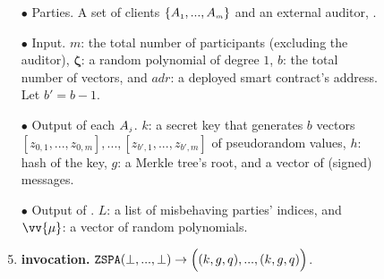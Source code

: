 



\begin{figure}[ht]%
\setlength{\fboxsep}{1pt}
\begin{center}
    \begin{tcolorbox}[enhanced,width=4.78in, height=110mm,right=.5mm,
    drop fuzzy shadow southwest,
    colframe=black,colback=white]

{\small{
\vspace{-2mm}
\begin{enumerate}[leftmargin=-.2mm]


\item[$\bullet$]    {Parties.} A set of clients $\{ A_{\scriptscriptstyle 1},...,  A_{\scriptscriptstyle m}\}$ and an external auditor, \aud. 

\item[$\bullet$]    {Input.}  $m$: the total number of participants (excluding the auditor), $\bm\zeta$: a random polynomial of degree $1$, $b$: the total number of vectors, and $adr$: a deployed smart contract's address. Let $b'=b-1$.







\item[$\bullet$]  {Output of  each} $  A_{\scriptscriptstyle j}$.   $k$: a secret key that generates $b$ vectors $[z_{\scriptscriptstyle 0,1},...,z_{\scriptscriptstyle 0,m}],...,[z_{\scriptscriptstyle b',1},...,z_{\scriptscriptstyle b', m}]$ of pseudorandom values, $h$: hash of the key,  $g$: a Merkle tree's root, and a vector of (signed) messages. 



\item[$\bullet$]    {Output of \aud.} $L$: a list of misbehaving parties' indices, and  $\vv{{\mu}}$: a vector of random polynomials.
%
\item\label{ZSPA::ZSPA-invocation} {\textbf{\zspa invocation.}  $\mathtt{ZSPA}(\bot,..., \bot)\rightarrow \Big((k, g, q),..., (k, g,q )\Big)$}. 


\end{enumerate}}}
\end{tcolorbox}
\end{center}
\end{figure}
